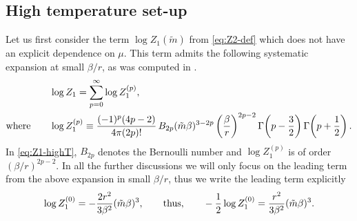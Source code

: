 \documentclass[a4paper,11pt]{article}
\begin{document}
\subsection{High temperature set-up}
\label{subsec:high-temperature-expansion}
Let us  first consider the term $\log Z_1(\tilde{m}) $ from \eqref{eq:Z2-def} which does not have an explicit dependence on $\mu$. This term admits  the following  systematic expansion at small
$\beta/r$, as was computed in  \cite{David:2024pir}.
\begin{align}
 &\log Z_1
 =\sum_{p=0}^{\infty}\log Z_1^{(p)},
 \nonumber\\
{\rm where}\qquad &\log Z_1^{(p)}
 \equiv
 \frac{(-1)^p(4p-2)}{4\pi(2p)!}\,
 B_{2p}(\tilde m\beta)^{3-2p}
 \left(\frac{\beta}{r}\right)^{2p-2}
 \Gamma\!\left(p-\frac32\right)
 \Gamma\!\left(p+\frac12\right).
 \label{eq:Z1-highT}
\end{align}
In \eqref{eq:Z1-highT}, $B_{2p}$ denotes the Bernoulli number and
$\log Z_1^{(p)}$ is of order $(\beta/r)^{2p-2}$. In all the further discussions we will only focus on the leading term from the above expansion in small $\beta/r$, thus we write the leading term explicitly
\begin{equation}
 \log Z_1^{(0)}
 =-\frac{2r^2}{3\beta^2}(\tilde m\beta)^3,
 \qquad {\rm thus,}\qquad
 -\frac12\log Z_1^{(0)}
 =\frac{r^2}{3\beta^2}(\tilde m\beta)^3.
 \label{eq:Z1-p0}
\end{equation}
\\
\end{document}

